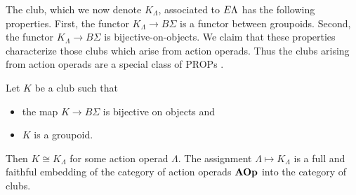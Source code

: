The club, which we now denote $K_{\Lambda}$, associated to $E\Lambda$ has the following properties. First, the functor $K_{\Lambda} \rightarrow B\Sigma$ is a functor between groupoids. Second, the functor $K_{\Lambda} \rightarrow B\Sigma$ is  bijective-on-objects. We claim that these properties characterize those clubs which arise from action operads. Thus the clubs arising from action operads are a special class of PROPs \cite{mac_prop, markl_prop}.

\begin{thm}\label{thm:club=operad}
Let $K$ be a club such that
\begin{itemize}
\item the map $K \rightarrow B\Sigma$ is bijective on objects and
\item $K$ is a groupoid.
\end{itemize}
Then $K \cong K_{\Lambda}$ for some action operad $\Lambda$. The assignment $\Lambda \mapsto K_{\Lambda}$ is a full and faithful embedding of the category of action operads $\mathbf{AOp}$ into the category of clubs.
\end{thm}
